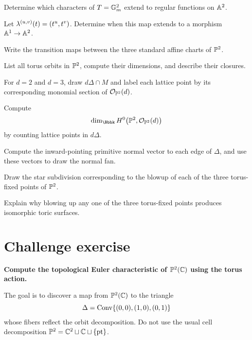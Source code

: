 \begin{exercises}

\item Determine which characters of \(T=\mathbb{G}_{m}^2\) extend to regular
functions on \(\mathbb{A}^2\).

\item Let \(\lambda^{(u,v)}(t)=(t^u,t^v)\). Determine when this map
extends to a morphism \(\mathbb{A}^1\to\mathbb{A}^2\).

\item Write the transition maps between the three standard affine
charts of \(\mathbb{P}^2\).

\item List all torus orbits in \(\mathbb{P}^2\), compute their dimensions, and
describe their closures.

\item For \(d=2\) and \(d=3\), draw \(d\Delta\cap M\) and label each
lattice point by its corresponding monomial section of
\(\mathcal{O}_{\mathbb{P}^2}(d)\).

\item Compute
\[
\dim_{\Bbbk}\Hzero{\PP^2}{\cO_{\PP^2}(d)}
\]
by counting lattice points in \(d\Delta\).

\item Compute the inward-pointing primitive normal vector to each edge
of \(\Delta\), and use these vectors to draw the normal fan.

\item Draw the star subdivision corresponding to the blowup of each
of the three torus-fixed points of \(\mathbb{P}^2\).

\item Explain why blowing up any one of the three torus-fixed points
produces isomorphic toric surfaces.

\end{exercises}

\clearpage
\section*{Challenge exercise}

\noindent
\textbf{Compute the topological Euler characteristic of
\(\mathbb{P}^2(\mathbb{C})\) using the torus action.}

\medskip

The goal is to discover a map from \(\mathbb{P}^2(\mathbb{C})\) to the triangle
\[
\Delta=\operatorname{Conv}\{(0,0),(1,0),(0,1)\}
\]
whose fibers reflect the orbit decomposition. Do not use the usual
cell decomposition
\(\mathbb{P}^2=\mathbb{C}^2\sqcup\mathbb{C}\sqcup\{\mathrm{pt}\}\).

